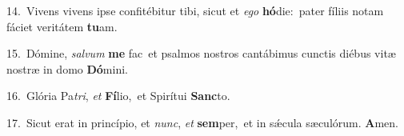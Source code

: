 {\numbfont\textcolor{\numbcolor}{14.}}~Vivens vivens ipse confitébitur tibi, sicut et \textit{e}\-\textit{go} \textbf{hó}\-die:~\star pater fíliis notam fáciet veritátem \textbf{tu}\-am.\par
{\numbfont\textcolor{\numbcolor}{15.}}~Dómine, \textit{sal}\-\textit{vum} \textbf{me} fac~\star et psalmos nostros cantábimus cunctis diébus vitæ nostræ in domo \textbf{Dó}\-mini.\par
{\numbfont\textcolor{\numbcolor}{16.}}~Glória Pa\-\textit{tri}\-, \textit{et} \textbf{Fí}\-lio,~\star et Spirítui \textbf{Sanc}\-to.\par
{\numbfont\textcolor{\numbcolor}{17.}}~Sicut erat in princípio, et \textit{nunc}\-, \textit{et} \textbf{sem}\-per,~\star et in sǽcula sæculórum. \textbf{A}\-men.\par
